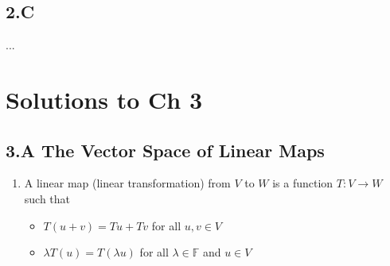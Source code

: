 \documentclass[11pt]{article}
\begin{document}
\subsection*{2.C}
...

\section*{Solutions to Ch 3}
\subsection*{3.A The Vector Space of Linear Maps}
\begin{enumerate}
	\item A linear map (linear transformation) from $V$ to $W$ is a function $T: V \rightarrow W$ such that 
	\begin{itemize}
		\item $T(u + v) = Tu + Tv$ for all $u, v \in V$
		\item $\lambda T(u) = T(\lambda u)$ for all $\lambda \in \mathbb{F}$ and $u \in V$
	\end{itemize}
\end{enumerate}
\end{document}
